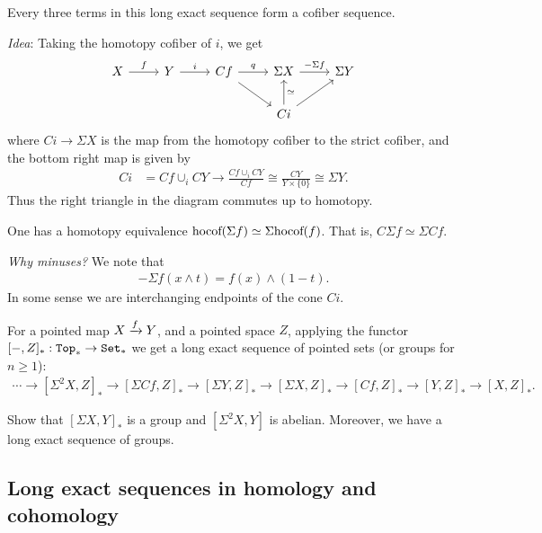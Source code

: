 \documentclass{article}[11pt]
\newcommand{\smashprod}{\wedge} %
\begin{document}
\begin{proposition} Every three terms in this long exact sequence form a cofiber sequence.
\end{proposition}

\textit{Idea}: Taking the homotopy cofiber of $i$, we get
\[
	\begin{tikzcd}
	X\rar["f"] & Y\rar["i"] & Cf\rar["q"]\ar[dr] & \Sigma X \rar["-\Sigma f"] & \Sigma Y \\
	 & & & Ci \uar["\simeq" right]\ar[ur]
	\end{tikzcd}
\]
where $Ci \to \Sigma X$ is the map from the homotopy cofiber to the strict cofiber, and the bottom right map is given by
\begin{align*}
	Ci &= Cf\cup_i CY \to \frac{Cf \cup_i CY}{Cf} \cong \frac{CY}{Y\times\{0\}} \cong \Sigma Y.
\end{align*}
Thus the right triangle in the diagram commutes up to homotopy.

\begin{exercise} One has a homotopy equivalence $\text{hocof}(\Sigma f) \simeq \Sigma \text{hocof}(f)$. That is, $C\Sigma f \simeq \Sigma Cf$.
\end{exercise}

\textit{Why minuses?} We note that
\begin{align*}
	-\Sigma f (x\smashprod t) = f(x) \smashprod (1-t).
\end{align*}
In some sense we are interchanging endpoints of the cone $Ci$. %

\begin{proposition} For a pointed map $X\xrightarrow{f} Y$, and a pointed space $Z$, applying the functor $[-,Z]_\ast : \texttt{Top}_\ast \to \texttt{Set}_\ast$ we get a long exact sequence of pointed sets (or groups for $n\geq 1$):
\begin{align*}
	\cdots \to [\Sigma^2 X, Z]_\ast \to [\Sigma Cf ,Z]_\ast \to  [\Sigma Y,Z]_\ast \to  [\Sigma X, Z]_\ast \to  [Cf,Z]_\ast \to  [Y,Z]_\ast \to  [X,Z]_\ast.
\end{align*}
\end{proposition}

\begin{exercise} Show that $[\Sigma X, Y]_\ast$ is a group and $[\Sigma^2 X, Y]$ is abelian. Moreover, we have a long exact sequence of groups.
\end{exercise}




\subsection{Long exact sequences in homology and cohomology} 
\end{document}
